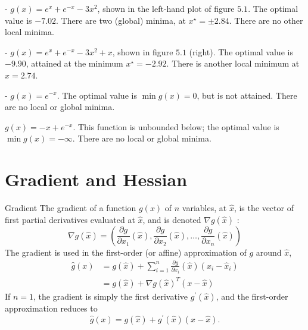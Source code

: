 \begin{example}
    - $ g(x)=e^{x}+e^{-x}-3 x^{2} $, shown in the left-hand plot of figure $ 5.1 $. The optimal value is $ -7.02 $. There are two (global) minima, at $ x^{\star}=\pm 2.84 $. There are no other local minima.
\end{example}

\begin{example}
    - $ g(x)=e^{x}+e^{-x}-3 x^{2}+x $, shown in figure $ 5.1 $ (right). The optimal value is $ -9.90 $, attained at the minimum $ x^{\star}=-2.92 . $ There is another local minimum at $ x=2.74 $.
\end{example}

\begin{example}
    - $ g(x)=e^{-x} $. The optimal value is $ \min g(x)=0 $, but is not attained. There are no local or global minima.
\end{example}

\begin{example}
    $ g(x)=-x+e^{-x} $. This function is unbounded below; the optimal value is $ \min g(x)=-\infty $. There are no local or global minima.
\end{example}

\section{Gradient and Hessian}

\begin{definition}
    Gradient The gradient of a function $ g(x) $ of $ n $ variables, at $ \hat{x} $, is the vector of first partial derivatives evaluated at $ \hat{x} $, and is denoted $ \nabla g(\hat{x}) $ :
\begin{equation}
\nabla g(\hat{x})=\left(\frac{\partial g}{\partial x_{1}}(\hat{x}), \frac{\partial g}{\partial x_{2}}(\hat{x}), \ldots, \frac{\partial g}{\partial x_{n}}(\hat{x})\right)
\end{equation}
The gradient is used in the first-order (or affine) approximation of $ g $ around $ \hat{x} $,
\begin{equation}
\begin{aligned}
\hat{g}(x) &=g(\hat{x})+\sum_{i=1}^{n} \frac{\partial g}{\partial x_{i}}(\hat{x})\left(x_{i}-\hat{x}_{i}\right) \\
&=g(\hat{x})+\nabla g(\hat{x})^{T}(x-\hat{x})
\end{aligned}
\end{equation}
If $ n=1 $, the gradient is simply the first derivative $ g^{\prime}(\hat{x}) $, and the first-order approximation reduces to
\begin{equation}
\hat{g}(x)=g(\hat{x})+g^{\prime}(\hat{x})(x-\hat{x}) .
\end{equation}
\end{definition}

